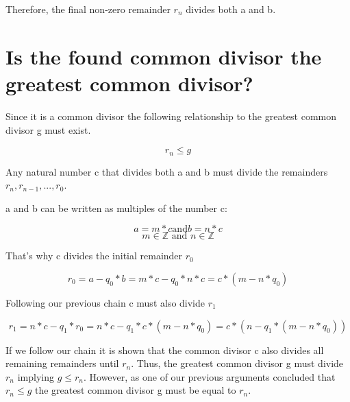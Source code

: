 \documentclass[a4paper]{article}
\begin{document}
	\begin{center}
		Therefore, the final non-zero remainder $r_{n}$ divides both a and b.
	\end{center}
	\section{Is the found common divisor the greatest common divisor?}
	\begin{center}Since it is a common divisor the following relationship to the greatest common divisor g must exist.
	\end{center}
	\begin{equation*}
		r_{n} \leq g
	\end{equation*}
	\begin{center}
		Any natural number c that divides both a and b must divide the remainders $r_{n}, r_{n - 1}, \text{...}, r_{0}$.
	\end{center}
	\begin{center}
		 a and b can be written as multiples of the number c:
	\end{center}
	\begin{equation*}
		a = m * c \text{and} b = n * c
	\end{equation*}
	\begin{equation*}
		m \in \mathbb{Z} \text{ and } n \in \mathbb{Z}
	\end{equation*}
	\begin{center}
		That's why c divides the initial remainder $r_{0}$
	\end{center}
	\begin{equation*}
		r_{0} = a - q_{0} * b = m * c - q_{0} * n * c = c * (m - n * q_{0})
	\end{equation*}
	\begin{center}
		Following our previous chain c must also divide $r_{1}$
	\end{center}
	\begin{equation*}
		r_{1} = n * c - q_{1} * r_{0} = n * c - q_{1} * c *(m - n * q_{0}) = c * (n - q_{1} * (m - n * q_{0}))
	\end{equation*}
	\begin{center}
		If we follow our chain it is shown that the common divisor c also divides all remaining remainders until $r_{n}$. Thus, the greatest common divisor g must divide $r_{n}$ implying $g \leq r_{n}$. However, as one of our previous arguments concluded that $r_{n} \leq g$ the greatest common divisor g must be equal to $r_{n}$.
	\end{center}
\end{document}
